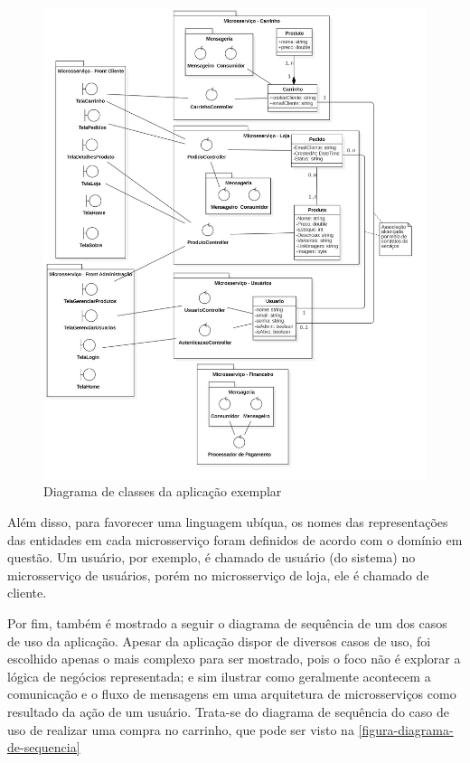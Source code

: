 \begin{figure}[htb]
	\caption{\label{figura-diagrama-de-classes}Diagrama de classes da aplicação exemplar}
	\begin{center}
	    \includegraphics[scale=0.25]{Diagramas/imagens/Classes.jpg}
	\end{center}
\end{figure}

Além disso, para favorecer uma linguagem ubíqua, os nomes das representações das entidades em cada microsserviço foram definidos de acordo com o domínio em questão. Um usuário, por exemplo, é chamado de usuário (do sistema) no microsserviço de usuários, porém no microsserviço de loja, ele é chamado de cliente.

Por fim, também é mostrado a seguir o diagrama de sequência de um dos casos de uso da aplicação. Apesar da aplicação dispor de diversos casos de uso, foi escolhido apenas o mais complexo para ser mostrado, pois o foco não é explorar a lógica de negócios representada; e sim ilustrar como geralmente acontecem a comunicação e o fluxo de mensagens em uma arquitetura de microsserviços como resultado da ação de um usuário. Trata-se do diagrama de sequência do caso de uso de realizar uma compra no carrinho, que pode ser visto na \autoref{figura-diagrama-de-sequencia}

